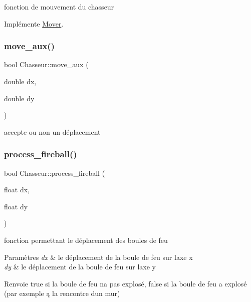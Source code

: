 fonction de mouvement du chasseur 



Implémente \hyperlink{classMover_a2e1858e5c93ddaa85ff7b446ad403b79}{Mover}.

\mbox{\label{classChasseur_aa6379811f429b4a20c60081493f1ee01}} 
\subsubsection{\texorpdfstring{move\+\_\+aux()}{move\_aux()}}
{\footnotesize\ttfamily bool Chasseur\+::move\+\_\+aux (\begin{DoxyParamCaption}\item[{double}]{dx,  }\item[{double}]{dy }\end{DoxyParamCaption})\hspace{0.3cm}{\ttfamily [private]}}



accepte ou non un déplacement 

\mbox{\label{classChasseur_a00710f53a84dfcf6ae60deed589cea1e}} 
\subsubsection{\texorpdfstring{process\+\_\+fireball()}{process\_fireball()}}
{\footnotesize\ttfamily bool Chasseur\+::process\+\_\+fireball (\begin{DoxyParamCaption}\item[{float}]{dx,  }\item[{float}]{dy }\end{DoxyParamCaption})\hspace{0.3cm}{\ttfamily [virtual]}}



fonction permettant le déplacement des boules de feu 


\begin{DoxyParams}{Paramètres}
{\em dx} & le déplacement de la boule de feu sur l\textquotesingle{}axe x \\
\hline
{\em dy} & le déplacement de la boule de feu sur l\textquotesingle{}axe y \\
\hline
\end{DoxyParams}
\begin{DoxyReturn}{Renvoie}
true si la boule de feu n\textquotesingle{}a pas explosé, false si la boule de feu a explosé (par exemple ą la rencontre d\textquotesingle{}un mur) 
\end{DoxyReturn}


